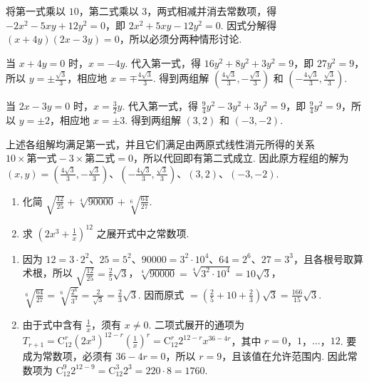 \begin{solution}
将第一式乘以 \(10\)，第二式乘以 \(3\)，两式相减并消去常数项，得 \(-2x^2-5xy+12y^2=0\)，即 \(2x^2+5xy-12y^2=0\). 因式分解得 \(\left(x+4y\right)\left(2x-3y\right)=0\)，所以必须分两种情形讨论.

当 \(x+4y=0\) 时，\(x=-4y\). 代入第一式，得 \(16y^2+8y^2+3y^2=9\)，即 \(27y^2=9\)，所以 \(y=\pm\frac{\sqrt3}{3}\)，相应地 \(x=\mp\frac{4\sqrt3}{3}\). 得到两组解 \(\left(\frac{4\sqrt3}{3},-\frac{\sqrt3}{3}\right)\) 和 \(\left(-\frac{4\sqrt3}{3},\frac{\sqrt3}{3}\right)\).

当 \(2x-3y=0\) 时，\(x=\frac32y\). 代入第一式，得 \(\frac94y^2-3y^2+3y^2=9\)，即 \(\frac94y^2=9\)，所以 \(y=\pm2\)，相应地 \(x=\pm3\). 得到两组解 \(\left(3,2\right)\) 和 \(\left(-3,-2\right)\).

上述各组解均满足第一式，并且它们满足由两原式线性消元所得的关系 \(10\times\text{第一式}-3\times\text{第二式}=0\)，所以代回即有第二式成立. 因此原方程组的解为 \(\left(x,y\right)=\left(\frac{4\sqrt3}{3},-\frac{\sqrt3}{3}\right)\)、\(\left(-\frac{4\sqrt3}{3},\frac{\sqrt3}{3}\right)\)、\(\left(3,2\right)\)、\(\left(-3,-2\right)\).
\end{solution}

\begin{problem}
\begin{enumerate}
    \item 化简 \(\sqrt{\frac{12}{25}} + \sqrt[4]{90000} + \sqrt[6]{\frac{64}{27}}\).
    \item 求 \(\left( 2x^{3} + \frac{1}{x} \right)^{12}\) 之展开式中之常数项.
\end{enumerate}
\end{problem}

\begin{solution}
\begin{enumerate}
\item
因为 \(12=3\cdot2^2\)、\(25=5^2\)、\(90000=3^2\cdot10^4\)、\(64=2^6\)、\(27=3^3\)，且各根号取算术根，所以
\(\sqrt{\frac{12}{25}}=\frac25\sqrt3\)，\(\sqrt[4]{90000}=\sqrt[4]{3^2\cdot10^4}=10\sqrt3\)，\(\sqrt[6]{\frac{64}{27}}=\sqrt[6]{\frac{2^6}{3^3}}=\frac{2}{\sqrt3}=\frac23\sqrt3\). 因而原式 \(=\left(\frac25+10+\frac23\right)\sqrt3=\frac{166}{15}\sqrt3\).

\item 由于式中含有 \(\frac1x\)，须有 \(x\ne0\). 二项式展开的通项为 \(T_{r+1}=\mathrm C_{12}^{r}\left(2x^3\right)^{12-r}\left(\frac1x\right)^r=\mathrm C_{12}^{r}2^{12-r}x^{36-4r}\)，其中 \(r=0\)，\(1\)，\(\ldots\)，\(12\). 要成为常数项，必须有 \(36-4r=0\)，所以 \(r=9\)，且该值在允许范围内. 因此常数项为 \(\mathrm C_{12}^{9}2^{12-9}=\mathrm C_{12}^{3}2^3=220\cdot8=1760\).
\end{enumerate}
\end{solution}

